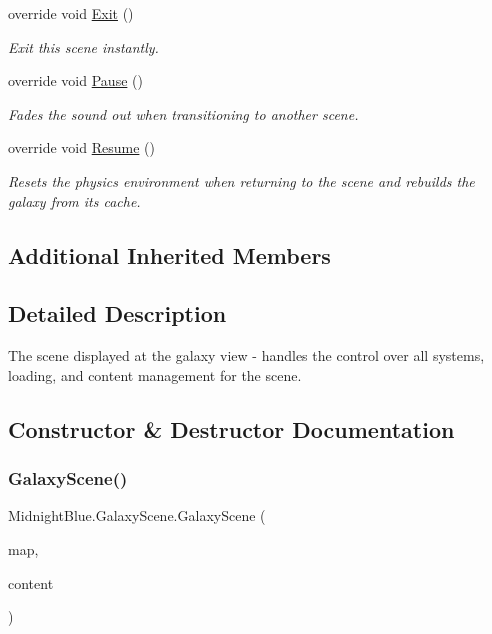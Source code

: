 \begin{DoxyCompactItemize}
override void \hyperlink{class_midnight_blue_1_1_galaxy_scene_a7a96978e050da997330bcc0f3cd00f9e}{Exit} ()
\begin{DoxyCompactList}\small\item\em Exit this scene instantly. \end{DoxyCompactList}\item 
override void \hyperlink{class_midnight_blue_1_1_galaxy_scene_aeb44afaeda2cccd225e64908bb76bee4}{Pause} ()
\begin{DoxyCompactList}\small\item\em Fades the sound out when transitioning to another scene. \end{DoxyCompactList}\item 
override void \hyperlink{class_midnight_blue_1_1_galaxy_scene_ab641e6727cdb64dc6487e9a229521692}{Resume} ()
\begin{DoxyCompactList}\small\item\em Resets the physics environment when returning to the scene and rebuilds the galaxy from its cache. \end{DoxyCompactList}\end{DoxyCompactItemize}
\subsection*{Additional Inherited Members}


\subsection{Detailed Description}
The scene displayed at the galaxy view -\/ handles the control over all systems, loading, and content management for the scene. 



\subsection{Constructor \& Destructor Documentation}
\hypertarget{class_midnight_blue_1_1_galaxy_scene_acdd82e3464ea18ca77bcf4694e9803a5}{}\label{class_midnight_blue_1_1_galaxy_scene_acdd82e3464ea18ca77bcf4694e9803a5} 
\subsubsection{\texorpdfstring{Galaxy\+Scene()}{GalaxyScene()}}
{\footnotesize\ttfamily Midnight\+Blue.\+Galaxy\+Scene.\+Galaxy\+Scene (\begin{DoxyParamCaption}\item[{\hyperlink{class_midnight_blue_1_1_engine_1_1_entity_component_1_1_entity_map}{Entity\+Map}}]{map,  }\item[{Content\+Manager}]{content }\end{DoxyParamCaption})\hspace{0.3cm}{\ttfamily [inline]}}



